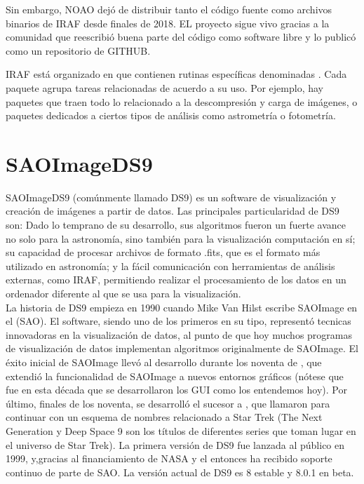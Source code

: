\documentclass[12pt]{article}
\begin{document}
Sin embargo, NOAO dejó de distribuir tanto el código fuente como archivos binarios de IRAF desde finales de 2018. EL proyecto sigue vivo gracias a la comunidad que reescribió buena parte del código como software libre y lo publicó como un repositorio de GITHUB.

IRAF está organizado en  que contienen rutinas específicas denominadas . Cada paquete agrupa tareas relacionadas de acuerdo a su uso. Por ejemplo, hay paquetes que traen todo lo relacionado a la descompresión y carga de imágenes, o paquetes dedicados a ciertos tipos de análisis como astrometría o fotometría.



\section{SAOImageDS9}
\label{ds9}
SAOImageDS9 (comúnmente llamado DS9) es un software de visualización y creación de imágenes a partir de datos. Las principales particularidad de DS9 son: Dado lo temprano de su desarrollo, sus algoritmos fueron un fuerte avance no solo para la astronomía, sino también para la visualización computación en sí; su capacidad de procesar archivos de formato .fits, que es el formato más utilizado en astronomía; y la fácil comunicación con herramientas de análisis externas, como IRAF, permitiendo realizar el procesamiento de los datos en un ordenador diferente al que se usa para la visualización.\\
La historia de DS9 empieza en 1990 cuando Mike Van Hilst escribe SAOImage en el  (SAO). El software, siendo uno de los primeros en su tipo, representó tecnicas innovadoras en la visualización de datos, al punto de que hoy muchos programas de visualización de datos implementan algoritmos originalmente de SAOImage. El éxito inicial de SAOImage llevó al desarrollo durante los noventa de , que extendió la funcionalidad de SAOImage a nuevos entornos gráficos (nótese que fue en esta década que se desarrollaron los GUI como los entendemos hoy). Por último, finales de los noventa, se desarrolló el sucesor a , que llamaron  para continuar con un esquema de nombres relacionado a Star Trek (The Next Generation y Deep Space 9 son los títulos de diferentes series que toman lugar en el universo de Star Trek). La primera versión de DS9 fue lanzada al público en 1999, y,gracias al financiamiento de NASA y el  entonces ha recibido soporte continuo de parte de SAO. La versión actual de DS9 es 8 estable y 8.0.1 en beta.\cite{ds9}
\end{document}
